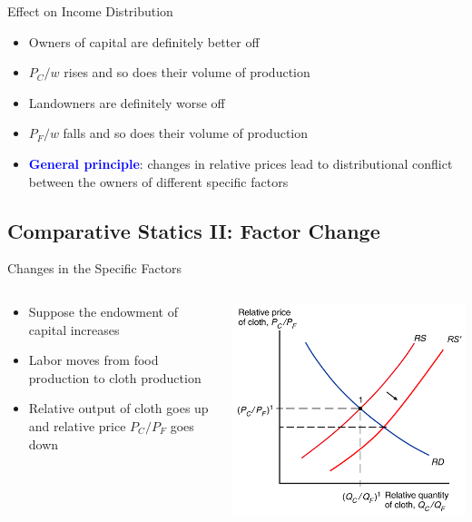 \documentclass[10pt,hyperref={CJKbookmarks=true},xcolor=dvipsnames,aspectratio=169]{beamer}
\begin{document}
\begin{frame}{Effect on Income Distribution}

\begin{itemize}
\item Owners of capital are definitely better off 
\item $P_{C}/w$ rises and so does their volume of production 
\item Landowners are definitely worse off 
\item $P_{F}/w$ falls and so does their volume of production 
\item \textbf{\textcolor{blue}{General principle}}: changes in relative
prices lead to distributional conflict between the owners of different
specific factors 
\end{itemize}
\end{frame}



\subsection{Comparative Statics II: Factor Change}
\begin{frame}{Changes in the Specific Factors}


\begin{columns}[onlytextwidth]
\begin{column}{0.4\textwidth}
\begin{itemize}
\item Suppose the endowment of capital increases 
\item Labor moves from food production to cloth production 
\item Relative output of cloth goes up and relative price $P_{C}/P_{F}$
goes down 
\end{itemize}

\end{column}
\begin{column}{0.6\textwidth}
\centering \includegraphics[width=0.8\columnwidth]{fig/sfm/lec4-19}
\end{column}
\end{columns}

\end{frame}
\end{document}
